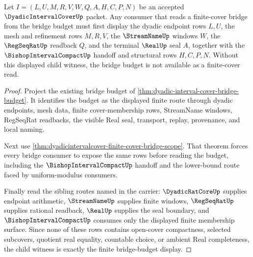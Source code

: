 \begin{theorem}
\label{thm:dyadicintervalcover-bridge-budget-child-witness}
Let $I=(L,U,M,R,V,W,Q,A,H,C,P,N)$ be an accepted $\DyadicIntervalCoverUp$ packet. Any consumer that reads a finite-cover bridge from the bridge budget must first display the dyadic endpoint rows $L,U$, the mesh and refinement rows $M,R,V$, the $\StreamNameUp$ windows $W$, the $\RegSeqRatUp$ readback $Q$, and the terminal $\RealUp$ seal $A$, together with the $\BishopIntervalCompactUp$ handoff and structural rows $H,C,P,N$. Without this displayed child witness, the bridge budget is not available as a finite-cover read.
\end{theorem}
\begin{proof}
Project the existing bridge budget of \autoref{thm:dyadic-interval-cover-bridge-budget}. It identifies the budget as the displayed finite route through dyadic endpoints, mesh data, finite cover-membership rows, StreamName windows, RegSeqRat readbacks, the visible Real seal, transport, replay, provenance, and local naming.

Next use \autoref{thm:dyadicintervalcover-finite-cover-bridge-scope}. That theorem forces every bridge consumer to expose the same rows before reading the budget, including the $\BishopIntervalCompactUp$ handoff and the lower-bound route faced by uniform-modulus consumers.

Finally read the sibling routes named in the carrier: $\DyadicRatCoreUp$ supplies endpoint arithmetic, $\StreamNameUp$ supplies finite windows, $\RegSeqRatUp$ supplies rational readback, $\RealUp$ supplies the seal boundary, and $\BishopIntervalCompactUp$ consumes only the displayed finite membership surface. Since none of these rows contains open-cover compactness, selected subcovers, quotient real equality, countable choice, or ambient Real completeness, the child witness is exactly the finite bridge-budget display.
\end{proof}
